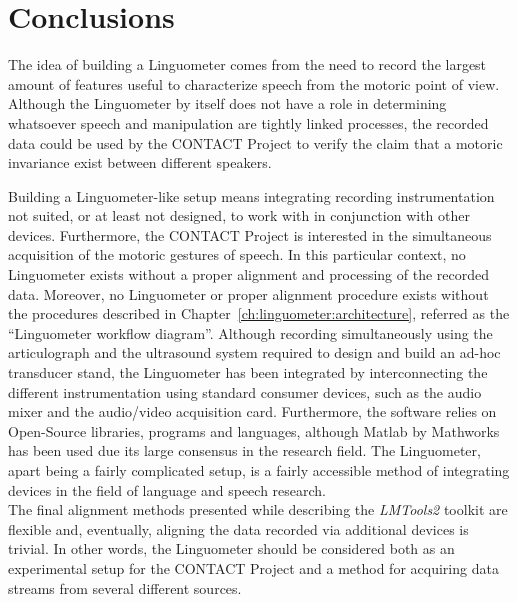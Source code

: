\chapter{Conclusions}
\label{ch:conclusions}
The idea of building a Linguometer comes from the need to record the largest
amount of features useful to characterize speech from the motoric point of view.
Although the Linguometer by itself does not have a role in determining
whatsoever speech and manipulation are tightly linked processes, the recorded 
data could be used by the CONTACT Project to verify the claim that a motoric
invariance exist between different speakers.

Building a Linguometer-like setup means integrating recording instrumentation
not suited, or at least not designed, to work with in conjunction with 
other devices.
Furthermore, the CONTACT Project is interested in the simultaneous acquisition
of the motoric gestures of speech.
In this particular context, no Linguometer exists without a proper alignment and
processing of the recorded data.
Moreover, no Linguometer or proper alignment procedure exists without the 
procedures described in Chapter~\ref{ch:linguometer:architecture}, referred 
as the ``Linguometer workflow diagram''.
Although recording simultaneously using the articulograph and the ultrasound
system required to design and build an ad-hoc transducer stand, the Linguometer 
has been integrated by interconnecting the different instrumentation using
standard consumer devices, such as the audio mixer and the audio/video
acquisition card.
Furthermore, the software relies on Open-Source libraries,
programs and languages, although Matlab by Mathworks has been used due its large
consensus in the research field.
The
Linguometer, apart being a fairly complicated setup, is a fairly accessible
method of integrating devices in the field of language and speech research.\\
The final alignment methods presented while describing the \emph{LMTools2}
toolkit are flexible and, eventually, aligning the data recorded via additional
devices  is trivial.
In other words, the Linguometer should be considered both as an experimental
setup for the CONTACT Project and a method for acquiring data streams from 
several different sources.

